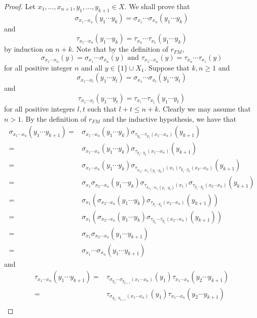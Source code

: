 \begin{proof}
Let $x_1,\dots ,x_{n+1},y_1,\dots ,y_{k+1}\in X$. We shall prove that
\[\sigma_{x_1\cdots x_n}(y_1\cdots y_k)=\sigma_{x_1}\cdots \sigma_{x_n}(y_1\cdots y_k)\] 
and 
\[\tau_{x_1\cdots x_n}(y_1\cdots y_k)=\tau_{x_n}\cdots \tau_{x_1}(y_1\cdots y_k)\]
by induction on $n+k$.
Note that by the definition of $r_{FM}$,
\[\sigma_{x_1\cdots x_n}(y)=\sigma_{x_1}\cdots \sigma_{x_n}(y)\text{ and }\tau_{x_1\cdots x_n}(y)=\tau_{x_n}\cdots \tau_{x_1}(y)\]
for all positive integer $n$ and all $y\in \{1\}\cup X_1$.  Suppose that $k,n\geq 1$ and
\[\sigma_{x_1\cdots x_l}(y_1\cdots y_t)=\sigma_{x_1}\cdots \sigma_{x_l}(y_1\cdots y_t)\]
and
\[\tau_{x_1\cdots x_l}(y_1\cdots y_t)=\tau_{x_l}\cdots \tau_{x_1}(y_1\cdots y_t)\]
for all positive integers $l,t$ such that $l+t\leq n+k$.
Clearly we may assume that $n>1$. By the definition of $r_{FM}$ and the inductive hypothesis, we have that
\begin{align*}
    \sigma_{x_1\cdots x_n}(y_1\cdots y_{k+1})=&\sigma_{x_1\cdots x_n}(y_1\cdots y_k)\sigma_{\tau_{y_{k}}\cdots \tau_{y_1}(x_1\cdots x_n)}(y_{k+1})\\
    =&\sigma_{x_1\cdots x_n}(y_1\cdots y_k)\sigma_{\tau_{y_{1}\cdots y_k}(x_1\cdots x_n)}(y_{k+1})\\
    =&\sigma_{x_1\cdots x_n}(y_1\cdots y_k)\sigma_{\tau_{\sigma_{x_2}\cdots\sigma_{x_n}(y_{1}\cdots y_k)}(x_1)\tau_{y_1\cdots y_k}(x_2\cdots x_n)}(y_{k+1})\\
    =&\sigma_{x_1}\sigma_{x_2\cdots x_n}(y_1\cdots y_k)\sigma_{\tau_{\sigma_{x_2}\cdots\sigma_{x_n}(y_{1}\cdots y_k)}(x_1)}\sigma_{\tau_{y_1\cdots y_k}(x_2\cdots x_n)}(y_{k+1})\\
    =&\sigma_{x_1}\left(\sigma_{x_2\cdots x_n}(y_1\cdots y_k)\sigma_{\tau_{y_1\cdots y_k}(x_2\cdots x_n)}(y_{k+1})\right)\\
    =&\sigma_{x_1}\left(\sigma_{x_2\cdots x_n}(y_1\cdots y_k)\sigma_{\tau_{y_k}\cdots \tau_{y_1}(x_2\cdots x_n)}(y_{k+1})\right)\\
    =&\sigma_{x_1}\sigma_{x_2\cdots x_n}(y_1\cdots y_{k+1})\\
    =&\sigma_{x_1}\cdots\sigma_{x_n}(y_1\cdots y_{k+1})
    \end{align*}
and
\begin{align*}
    \tau_{x_1\cdots x_n}(y_1\cdots y_{k+1})=&\tau_{\sigma_{y_{2}}\cdots \sigma_{y_{k+1}}(x_1\cdots x_n)}(y_{1})\tau_{x_1\cdots x_n}(y_2\cdots y_{k+1})\\
    =&\tau_{\sigma_{y_{2}\cdots y_{k+1}}(x_1\cdots x_n)}(y_{1})\tau_{x_1\cdots x_n}(y_2\cdots y_{k+1})\\

\end{align*}
\end{proof}
